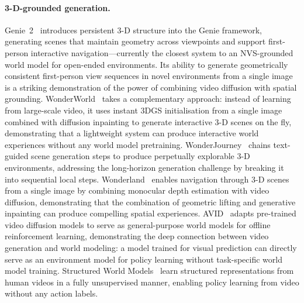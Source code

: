 \paragraph{3-D-grounded generation.}
Genie~2~\citep{parkerholder2024genie2} introduces persistent 3-D structure
into the Genie framework, generating scenes that maintain geometry across
viewpoints and support first-person interactive navigation---currently the
closest system to an NVS-grounded world model for open-ended environments.
Its ability to generate geometrically consistent first-person view sequences
in novel environments from a single image is a striking demonstration of
the power of combining video diffusion with spatial grounding.
WonderWorld~\citep{yu2024wonderworld} takes a complementary approach:
instead of learning from large-scale video, it uses instant 3DGS initialisation
from a single image combined with diffusion inpainting to generate interactive
3-D scenes on the fly, demonstrating that a lightweight system can produce
interactive world experiences without any world model pretraining.
WonderJourney~\citep{yu2023wonderjourney} chains text-guided scene generation
steps to produce perpetually explorable 3-D environments, addressing the
long-horizon generation challenge by breaking it into sequential local steps.
Wonderland~\citep{liang2024wonderland} enables navigation through 3-D scenes
from a single image by combining monocular depth estimation with video diffusion,
demonstrating that the combination of geometric lifting and generative inpainting
can produce compelling spatial experiences.
AVID~\citep{rigter2024avid} adapts pre-trained video diffusion models to serve
as general-purpose world models for offline reinforcement learning, demonstrating
the deep connection between video generation and world modeling:
a model trained for visual prediction can directly serve as an environment model
for policy learning without task-specific world model training.
Structured World Models~\citep{mendonca2023structured} learn structured
representations from human videos in a fully unsupervised manner,
enabling policy learning from video without any action labels.

